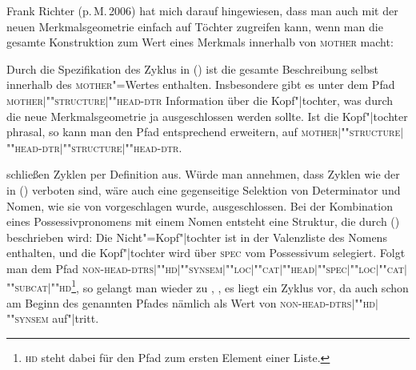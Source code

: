 Frank Richter (p.\,M.\,2006) hat mich darauf hingewiesen, dass man auch mit
der neuen Merkmalsgeometrie einfach auf Töchter zugreifen kann, wenn man die gesamte Konstruktion
zum Wert eines Merkmals innerhalb von \textsc{mother} macht:

\ea
{} 
\z
Durch die Spezifikation des Zyklus in () ist die gesamte Beschreibung selbst innerhalb des
\textsc{mother}"=Wertes enthalten. Insbesondere gibt es unter dem Pfad \textsc{mother$|$""struc\-ture$|$""head-dtr} Information über die Kopf"|tochter, was durch die neue
Merkmalsgeometrie ja ausgeschlossen werden sollte. Ist die Kopf"|tochter phrasal, so kann man den Pfad
entsprechend erweitern, \zb auf  \textsc{mother$|$""struc\-ture$|$""head-dtr$|$""struc\-ture$|$""head-dtr}.

\citet[]{ps} schließen Zyklen per Definition aus. Würde man annehmen, dass
Zyklen wie der in () verboten sind, wäre auch eine gegenseitige Selektion von Determinator und Nomen, wie sie von
\citet[Abschnitt~1.8]{ps2} vorgeschlagen wurde, %
ausgeschlossen. Bei der Kombination eines Possessivpronomens mit einem Nomen entsteht eine Struktur, die durch ()
beschrieben wird:
\ea
{}
\z
Die Nicht"=Kopf"|tochter ist in der Valenzliste des Nomens enthalten, und die Kopf"|tochter wird
über \textsc{spec} vom Possessivum selegiert. Folgt man dem Pfad
\textsc{non-head-dtrs$|$""hd$|$""synsem$|$""loc$|$""cat$|$""head$|$""spec$|$""loc$|$""cat$|$""subcat$|$""hd}\footnote{
  \textsc{hd} steht dabei für den Pfad zum ersten Element einer Liste.%
}, so gelangt man wieder zu , \dash, es liegt ein Zyklus vor, da  auch schon am
Beginn des genannten Pfades nämlich als Wert von \textsc{non-head-dtrs$|$""hd$|$""synsem} auf"|tritt.

